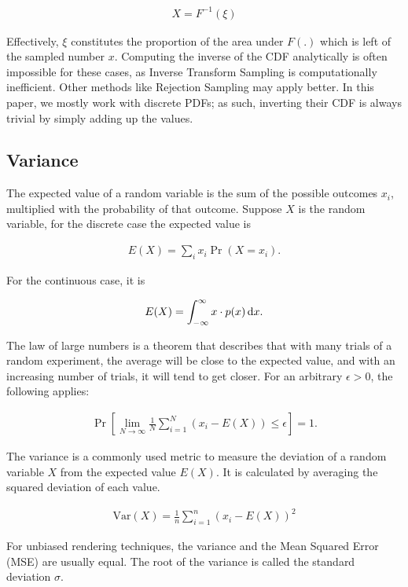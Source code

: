 \begin{align}
 X = F^{-1}(\xi)
\end{align}

Effectively, $\xi$ constitutes the proportion of the area under $F(.)$ which is left of the sampled number $x$. Computing the inverse of the CDF analytically is often impossible for these cases, as Inverse Transform Sampling is computationally inefficient. Other methods like Rejection Sampling may apply better. In this paper, we mostly work with discrete PDFs; as such, inverting their CDF is always trivial by simply adding up the values.

\subsection{Variance}
\label{sec:var}
The expected value of a random variable is the sum of the possible outcomes $x_i$, multiplied with the probability of that outcome. Suppose $X$ is the random variable, for the discrete case the expected value is

\begin{align}
 E(X) = \sum_i x_i \Pr(X = x_i).
\end{align}

For the continuous case, it is 

\begin{align}
 E(X) = \int_{-\infty}^{\infty} x \cdot p(x) \mathop{}\!\mathrm{d} x.
\end{align}

The law of large numbers is a theorem that describes that with many trials of a random experiment, the average will be close to the expected value, and with an increasing number of trials, it will tend to get closer. For an arbitrary $\epsilon > 0$, the following applies:

\begin{align}
 \Pr\left[ \lim_{N\rightarrow \infty} \frac{1}{N} \sum_{i=1}^N (x_i - E(X)) \leq \epsilon \right] = 1.
\end{align}

The variance is a commonly used metric to measure the deviation of a random variable $X$ from the expected value $E(X)$. It is calculated by averaging the squared deviation of each value.

\begin{align}
 \text{Var}(X) = \frac{1}{n} \sum_{i=1}^{n}(x_i - E(X))^2
\end{align}

For unbiased rendering techniques, the variance and the Mean Squared Error (MSE) are usually equal. The root of the variance is called the standard deviation $\sigma$.


